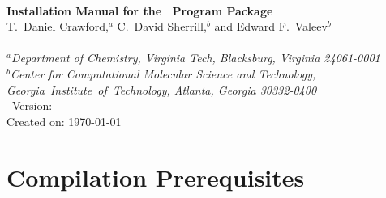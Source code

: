 \documentclass[12pt]{article}
\begin{document}


\begin{center}
\ \\
\vspace{2.0in}
{\bf {\Large Installation Manual for the \PSIthree\ Program Package}} \\
\vspace{0.5in}
T.\ Daniel Crawford,$^a$ C.\ David Sherrill,$^b$ and Edward F.\ Valeev$^b$ \\
\ \\
{\em $^a$Department of Chemistry, Virginia Tech, Blacksburg, Virginia 24061-0001} \\
\vspace{0.1in}
{\em $^b$Center for Computational Molecular Science and Technology, \mbox{Georgia 
Institute of Technology,} Atlanta, Georgia 30332-0400} 
\ \\
\vspace{0.3in}
\PSIthree\ Version: \PSIversion \\
Created on: \today
\end{center}

\thispagestyle{empty}

\newpage
\section{Compilation Prerequisites}
\end{document}
